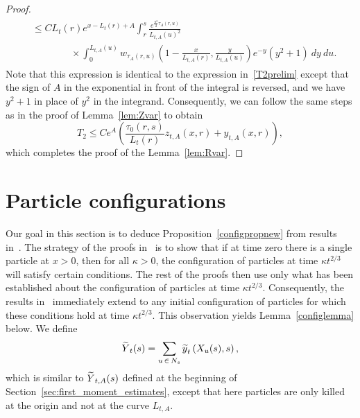 \documentclass[10pt]{amsart}
\theoremstyle{definition}\newtheorem{defi}[theo]{Definition}\newtheorem{rema}[theo]{Remark}\newtheorem{exam}[theo]{Example}\newtheorem{exem}[theo]{Example}\newtheorem{nota}[theo]{Notation}
\newcommand{\1} {\mathds{1}}
\let\oldtilde\tilde
\renewcommand*{\tilde}[1]{\mathchoice{\widetilde{#1}}{\widetilde{#1}}{\oldtilde{#1}}{\oldtilde{#1}}}
\begin{document}
\begin{proof}
\begin{multline*}
\begin{aligned}
&\leq C L_t(r) e^{x - L_t(r) + A} \int_r^s \frac{e^{\frac{\pi^2}{2} \tau_A(r,u)}}{L_{t,A}(u)^2} \\
&\qquad \qquad \times \int_0^{L_{t,A}(u)} w_{\tau_A(r,u)}\left(1 - \frac{x}{L_{t,A}(r)}, \frac{y}{L_{t,A}(u)} \right) e^{-y}\left(y^2 + 1\right) \: dy \: du.
\end{aligned}
\end{multline*}
Note that this expression is identical to the expression in~\eqref{T2prelim} except that the sign of $A$ in the exponential in front of the integral is reversed, and we have $y^2 + 1$ in place of $y^2$ in the integrand. Consequently, we can follow the same steps as in the proof of Lemma~\ref{lem:Zvar} to obtain
\[
T_2 \leq C e^A \left(\frac{\tau_0(r,s)}{L_t(r)} z_{t,A}(x,r) + y_{t,A}(x,r)\right),
\]
which completes the proof of the Lemma~\ref{lem:Rvar}.
\end{proof}

\section{Particle configurations}\label{configsec}

Our goal in this section is to deduce Proposition~\ref{configpropnew} from results in~\cite{bbs3}. The strategy of the proofs in~\cite{bbs3} is to show that if at time zero there is a single particle at $x > 0$, then for all $\kappa > 0$, the configuration of particles at time $\kappa t^{2/3}$ will satisfy certain conditions. The rest of the proofs then use only what has been established about the configuration of particles at time $\kappa t^{2/3}$. Consequently, the results in~\cite{bbs3} immediately extend to any initial configuration of particles for which these conditions hold at time $\kappa t^{2/3}$. This observation yields Lemma~\ref{configlemma} below. We define
\[
{\tilde Y}_t(s) = \sum_{u\,\in\,N_s} {\tilde y}_t\left(X_u(s),s\right),
\]
which is similar to ${\tilde Y}_{t,A}(s)$ defined at the beginning of Section~\ref{sec:first_moment_estimates}, except that here particles are only killed at the origin and not at the curve $L_{t,A}$.
\end{document}
